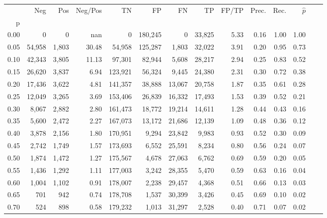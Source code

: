 \begin{tabular}{rrrrrrrrrrrrrr}
\toprule
{} &     Neg &    Pos & Neg/Pos &       TN &       FP &      FN &      TP & FP/TP & Prec. &  Rec. & $\hat{p}$ \\
p    &         &        &         &          &          &         &         &       &       &       &           \\
\midrule
0.00 &       0 &      0 &     nan &        0 &  180,245 &       0 &  33,825 &  5.33 &  0.16 &  1.00 &      1.00 \\
0.05 &  54,958 &  1,803 &   30.48 &   54,958 &  125,287 &   1,803 &  32,022 &  3.91 &  0.20 &  0.95 &      0.73 \\
0.10 &  42,343 &  3,805 &   11.13 &   97,301 &   82,944 &   5,608 &  28,217 &  2.94 &  0.25 &  0.83 &      0.52 \\
0.15 &  26,620 &  3,837 &    6.94 &  123,921 &   56,324 &   9,445 &  24,380 &  2.31 &  0.30 &  0.72 &      0.38 \\
0.20 &  17,436 &  3,622 &    4.81 &  141,357 &   38,888 &  13,067 &  20,758 &  1.87 &  0.35 &  0.61 &      0.28 \\
0.25 &  12,049 &  3,265 &    3.69 &  153,406 &   26,839 &  16,332 &  17,493 &  1.53 &  0.39 &  0.52 &      0.21 \\
0.30 &   8,067 &  2,882 &    2.80 &  161,473 &   18,772 &  19,214 &  14,611 &  1.28 &  0.44 &  0.43 &      0.16 \\
0.35 &   5,600 &  2,472 &    2.27 &  167,073 &   13,172 &  21,686 &  12,139 &  1.09 &  0.48 &  0.36 &      0.12 \\
0.40 &   3,878 &  2,156 &    1.80 &  170,951 &    9,294 &  23,842 &   9,983 &  0.93 &  0.52 &  0.30 &      0.09 \\
0.45 &   2,742 &  1,749 &    1.57 &  173,693 &    6,552 &  25,591 &   8,234 &  0.80 &  0.56 &  0.24 &      0.07 \\
0.50 &   1,874 &  1,472 &    1.27 &  175,567 &    4,678 &  27,063 &   6,762 &  0.69 &  0.59 &  0.20 &      0.05 \\
0.55 &   1,436 &  1,292 &    1.11 &  177,003 &    3,242 &  28,355 &   5,470 &  0.59 &  0.63 &  0.16 &      0.04 \\
0.60 &   1,004 &  1,102 &    0.91 &  178,007 &    2,238 &  29,457 &   4,368 &  0.51 &  0.66 &  0.13 &      0.03 \\
0.65 &     701 &    942 &    0.74 &  178,708 &    1,537 &  30,399 &   3,426 &  0.45 &  0.69 &  0.10 &      0.02 \\
0.70 &     524 &    898 &    0.58 &  179,232 &    1,013 &  31,297 &   2,528 &  0.40 &  0.71 &  0.07 &      0.02 \\

\end{tabular}
